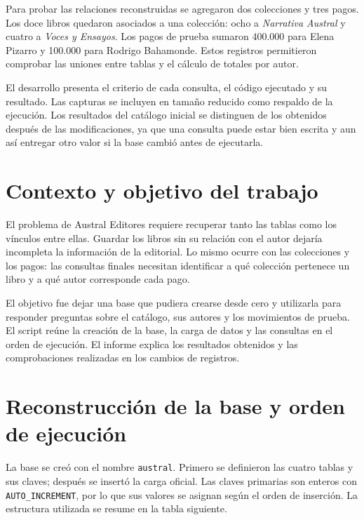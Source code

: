 \documentclass[11pt,a4paper]{article}
\begin{document}
Para probar las relaciones reconstruidas se agregaron dos colecciones y tres pagos. Los doce libros quedaron asociados a una colección: ocho a \textit{Narrativa Austral} y cuatro a \textit{Voces y Ensayos}. Los pagos de prueba sumaron 400.000 para Elena Pizarro y 100.000 para Rodrigo Bahamonde. Estos registros permitieron comprobar las uniones entre tablas y el cálculo de totales por autor.

El desarrollo presenta el criterio de cada consulta, el código ejecutado y su resultado. Las capturas se incluyen en tamaño reducido como respaldo de la ejecución. Los resultados del catálogo inicial se distinguen de los obtenidos después de las modificaciones, ya que una consulta puede estar bien escrita y aun así entregar otro valor si la base cambió antes de ejecutarla.

\newpage
\section{Contexto y objetivo del trabajo}

El problema de Austral Editores requiere recuperar tanto las tablas como los vínculos entre ellas. Guardar los libros sin su relación con el autor dejaría incompleta la información de la editorial. Lo mismo ocurre con las colecciones y los pagos: las consultas finales necesitan identificar a qué colección pertenece un libro y a qué autor corresponde cada pago.

El objetivo fue dejar una base que pudiera crearse desde cero y utilizarla para responder preguntas sobre el catálogo, sus autores y los movimientos de prueba. El script reúne la creación de la base, la carga de datos y las consultas en el orden de ejecución. El informe explica los resultados obtenidos y las comprobaciones realizadas en los cambios de registros.

\section{Reconstrucción de la base y orden de ejecución}

La base se creó con el nombre \texttt{austral}. Primero se definieron las cuatro tablas y sus claves; después se insertó la carga oficial. Las claves primarias son enteros con \texttt{AUTO\_INCREMENT}, por lo que sus valores se asignan según el orden de inserción. La estructura utilizada se resume en la tabla siguiente.
\end{document}
